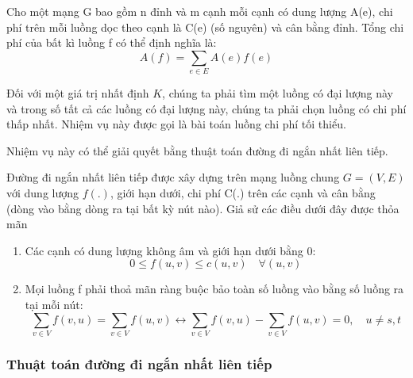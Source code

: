 \documentclass[a4paper]{article}
\begin{document}
    Cho một mạng G bao gồm n đỉnh và m cạnh mỗi cạnh có dung lượng A(e), chi phí trên mỗi luồng dọc theo cạnh là C(e) (số nguyên) và cân bằng đỉnh. 
    Tổng chi phí của bất kì luồng f có thể định nghĩa là:
    \begin{displaymath}
        A(f) = \sum\limits_{e \in E} A(e)f(e)
    \end{displaymath}

    Đối với một giá trị nhất định $K$, chúng ta phải tìm một luồng có đại lượng này và trong số tất cả các luồng có đại lượng này, chúng ta phải chọn luồng có chi phí thấp nhất. 
    Nhiệm vụ này được gọi là bài toán luồng chi phí tối thiểu.

    Nhiệm vụ này có thể giải quyết bằng thuật toán đường đi ngắn nhất liên tiếp.

    Đường đi ngắn nhất liên tiếp được xây dựng trên mạng luồng chung $G = (V,E)$ với dung lượng
    $f(.)$, giới hạn dưới, chi phí C(.) trên các cạnh và cân bằng (dòng vào bằng dòng ra tại bất kỳ nút nào). 
    Giả sử các điều dưới đây được thỏa mãn
    \begin{enumerate}
        \item Các cạnh có dung lượng không âm và giới hạn dưới bằng 0:
            \begin{displaymath}
                0 \leq f(u,v) \leq c(u,v) \quad \forall (u,v)
            \end{displaymath}
        \item Mọi luồng f phải thoả mãn ràng buộc bảo toàn số luồng vào bằng số luồng ra tại mỗi nút: 
            \begin{displaymath}
                \sum\limits_{v \in V} f(v,u) = \sum\limits_{v \in V} f(u,v) \leftrightarrow \sum\limits_{v \in V} f(v,u) - \sum\limits_{v \in V} f(u,v) = 0, \quad u \neq s,t
            \end{displaymath}
    \end{enumerate}

    \subsubsection{Thuật toán đường đi ngắn nhất liên tiếp}
\end{document}
